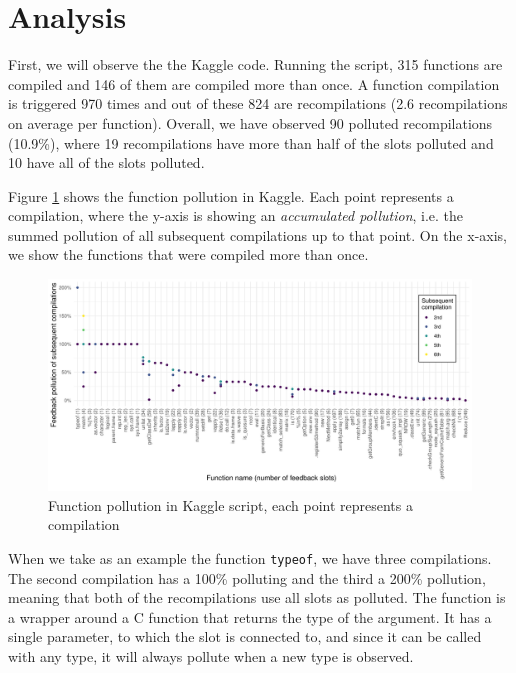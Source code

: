 \section{Analysis}

First, we will observe the the Kaggle code. Running the script, 315 functions are compiled and 146 of them are compiled more than once. A function compilation is triggered 970 times and out of these 824 are recompilations (2.6 recompilations on average per function). Overall, we have observed 90 polluted recompilations (10.9\%), where 19 recompilations have more than half of the slots polluted and 10 have all of the slots polluted.

Figure \ref{fig:kaggle-pollution} shows the function pollution in Kaggle. Each point represents a compilation, where the y-axis is showing an \textit{accumulated pollution}, i.e. the summed pollution of all subsequent compilations up to that point. On the x-axis, we show the functions that were compiled more than once.

\begin{figure}
	\centering
	\begin{adjustwidth}{-2cm}{-2cm}
		\includegraphics[width=1.3\textwidth]{figures/pollution/master/kaggle-function-pollution.pdf}
	\end{adjustwidth}
	\caption{Function pollution in Kaggle script, each point represents a compilation\cite{feedback-vmil}}\label{fig:kaggle-pollution}
\end{figure}

When we take as an example the function \texttt{typeof}, we have three compilations. The second compilation has a 100\% polluting and the third a 200\% pollution, meaning that both of the recompilations use all slots as polluted. The function is a wrapper around a C function that returns the type of the argument. It has a single parameter, to which the slot is connected to, and since it can be called with any type, it will always pollute when a new type is observed.


